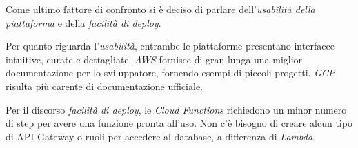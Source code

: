 Come ultimo fattore di confronto si è deciso di parlare dell'\textit{usabilità della piattaforma} e della \textit{facilità di deploy}.

Per quanto riguarda l'\textit{usabilità}, entrambe le piattaforme presentano interfacce intuitive, curate e dettagliate. \textit{AWS} fornisce di gran lunga una miglior documentazione per lo sviluppatore, fornendo esempi di piccoli progetti. \textit{GCP} risulta più carente di documentazione ufficiale.

Per il discorso \textit{facilità di deploy}, le \textit{Cloud Functions} richiedono un minor numero di step per avere una funzione pronta all'uso. Non c'è bisogno di creare alcun tipo di API Gateway o ruoli per accedere al database, a differenza di \textit{Lambda}.